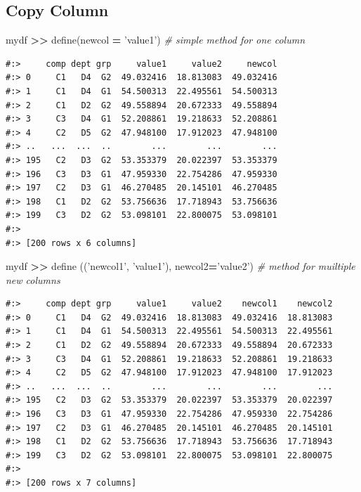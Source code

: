 \documentclass[
]{book}
\newenvironment{Shaded}{\begin{snugshade}}{\end{snugshade}}
\newcommand{\CommentTok}[1]{\textcolor[rgb]{0.37,0.37,0.37}{\textit{#1}}}
\newcommand{\NormalTok}[1]{#1}
\newcommand{\OperatorTok}[1]{\textcolor[rgb]{0.43,0.43,0.43}{\textbf{#1}}}
\newcommand{\StringTok}[1]{\textcolor[rgb]{0.5,0.5,0.5}{#1}}
\begin{document}
\hypertarget{copy-column}{%
\subsection{Copy Column}\label{copy-column}}

\begin{Shaded}
\begin{Highlighting}[]
\NormalTok{mydf }\OperatorTok{>>}\NormalTok{ define(newcol }\OperatorTok{=} \StringTok{'value1'}\NormalTok{)                 }\CommentTok{# simple method for one column}
\end{Highlighting}
\end{Shaded}

\begin{verbatim}
#:>     comp dept grp     value1     value2     newcol
#:> 0     C1   D4  G2  49.032416  18.813083  49.032416
#:> 1     C1   D4  G1  54.500313  22.495561  54.500313
#:> 2     C1   D2  G2  49.558894  20.672333  49.558894
#:> 3     C3   D4  G1  52.208861  19.218633  52.208861
#:> 4     C2   D5  G2  47.948100  17.912023  47.948100
#:> ..   ...  ...  ..        ...        ...        ...
#:> 195   C2   D3  G2  53.353379  20.022397  53.353379
#:> 196   C3   D3  G1  47.959330  22.754286  47.959330
#:> 197   C2   D3  G1  46.270485  20.145101  46.270485
#:> 198   C1   D2  G2  53.756636  17.718943  53.756636
#:> 199   C3   D2  G2  53.098101  22.800075  53.098101
#:> 
#:> [200 rows x 6 columns]
\end{verbatim}

\begin{Shaded}
\begin{Highlighting}[]
\NormalTok{mydf }\OperatorTok{>>}\NormalTok{ define ((}\StringTok{'newcol1'}\NormalTok{, }\StringTok{'value1'}\NormalTok{), newcol2}\OperatorTok{=}\StringTok{'value2'}\NormalTok{)  }\CommentTok{# method for muiltiple new columns}
\end{Highlighting}
\end{Shaded}

\begin{verbatim}
#:>     comp dept grp     value1     value2    newcol1    newcol2
#:> 0     C1   D4  G2  49.032416  18.813083  49.032416  18.813083
#:> 1     C1   D4  G1  54.500313  22.495561  54.500313  22.495561
#:> 2     C1   D2  G2  49.558894  20.672333  49.558894  20.672333
#:> 3     C3   D4  G1  52.208861  19.218633  52.208861  19.218633
#:> 4     C2   D5  G2  47.948100  17.912023  47.948100  17.912023
#:> ..   ...  ...  ..        ...        ...        ...        ...
#:> 195   C2   D3  G2  53.353379  20.022397  53.353379  20.022397
#:> 196   C3   D3  G1  47.959330  22.754286  47.959330  22.754286
#:> 197   C2   D3  G1  46.270485  20.145101  46.270485  20.145101
#:> 198   C1   D2  G2  53.756636  17.718943  53.756636  17.718943
#:> 199   C3   D2  G2  53.098101  22.800075  53.098101  22.800075
#:> 
#:> [200 rows x 7 columns]
\end{verbatim}
\end{document}

